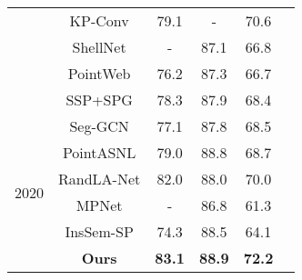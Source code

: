 \documentclass[10pt,twocolumn,letterpaper]{article}
\begin{document}
\begin{itemize}
\begin{table}
\begin{center}
{\begin{tabular}{|c|c|c c |c|c|}
&KP-Conv \cite{thomas2019kpconv}      & 79.1 & - & 70.6  \\
&ShellNet \cite{zhang2019shellnet}     & - & 87.1 & 66.8  \\
&PointWeb \cite{zhao2019pointweb}    & 76.2 & 87.3 & 66.7  \\
&SSP+SPG \cite{landrieu2019point}     & 78.3 & 87.9 & 68.4  \\\hline
\multirow{6}{*}{2020}
&Seg-GCN \cite{lei2020seggcn}     & 77.1 & 87.8 & 68.5  \\
&PointASNL \cite{yan2020pointasnl}   & 79.0 &88.8 & 68.7  \\
&RandLA-Net \cite{hu2020randla}      & 82.0 & 88.0 & 70.0        \\
&MPNet \cite{he2020learning}      & - & 86.8 & 61.3        \\
&InsSem-SP \cite{liu2020self}     & 74.3 & 88.5 & 64.1        \\
 \cline{2-5} 
&\textbf{Ours}  & \textbf{83.1} & \textbf{88.9} & \textbf{72.2}  \\ \hline
\end{tabular}
\label{tab:s3dis}
}
\end{center}
\vspace{-5mm}
\end{table}


\end{itemize}
\end{document}
